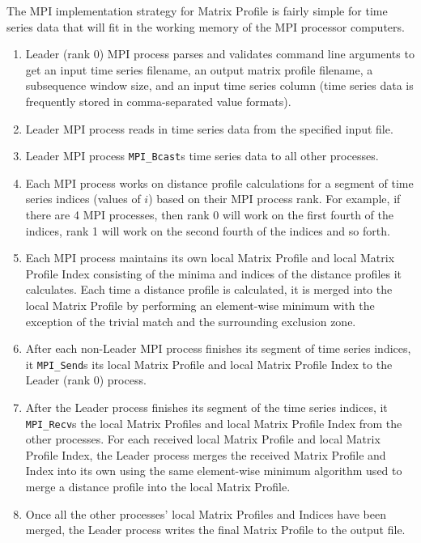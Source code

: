 \documentclass[conference]{IEEEtran}
\begin{document}
The MPI implementation strategy for Matrix Profile is fairly simple for time series data that will fit in the working memory of the MPI processor computers.  
\begin{enumerate}
    \item Leader (rank 0) MPI process parses and validates command line arguments to get an input time series filename, an output matrix profile filename, a subsequence window size, and an input time series column (time series data is frequently stored in comma-separated value formats).
    \item Leader MPI process reads in time series data from the specified input file.
    \item Leader MPI process \texttt{MPI\_Bcast}s time series data to all other processes.
    \item Each MPI process works on distance profile calculations for a segment of time series indices (values of $i$) based on their MPI process rank.  For example, if there are 4 MPI processes, then rank 0 will work on the first fourth of the indices, rank 1 will work on the second fourth of the indices and so forth. 
    \item Each MPI process maintains its own local Matrix Profile and local Matrix Profile Index consisting of the minima and indices of the distance profiles it calculates.  Each time a distance profile is calculated, it is merged into the local Matrix Profile by performing an element-wise minimum with the exception of the trivial match and the surrounding exclusion zone.
    \item After each non-Leader MPI process finishes its segment of time series indices, it \texttt{MPI\_Send}s its local Matrix Profile and local Matrix Profile Index to the Leader (rank 0) process.
    \item After the Leader process finishes its segment of the time series indices, it \texttt{MPI\_Recv}s the local Matrix Profiles and local Matrix Profile Index from the other processes.  For each received local Matrix Profile and local Matrix Profile Index, the Leader process merges the received Matrix Profile and Index into its own using the same element-wise minimum algorithm used to merge a distance profile into the local Matrix Profile.
    \item Once all the other processes' local Matrix Profiles and Indices have been merged, the Leader process writes the final Matrix Profile to the output file.
\end{enumerate}
\end{document}
